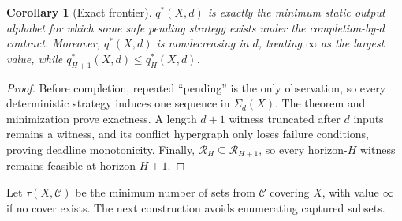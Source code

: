\documentclass[letterpaper,10pt,conference]{ieeeconf}
\newtheorem{corollary}{Corollary}
\newcommand{\cR}{\mathcal R}
\begin{document}
\begin{corollary}[Exact frontier]
$q^*(X,d)$ is exactly the minimum static output alphabet for which some safe pending strategy
exists under the completion-by-$d$ contract. Moreover, $q^*(X,d)$ is nondecreasing in $d$, treating
$\infty$ as the largest value, while $q_{H+1}^*(X,d)\le q_H^*(X,d)$.
\end{corollary}
\begin{proof}
Before completion, repeated ``pending'' is the only observation, so every deterministic strategy
induces one sequence in $\Sigma_d(X)$. The theorem and minimization prove exactness. A length
$d+1$ witness truncated after $d$ inputs remains a witness, and its conflict hypergraph only loses
failure conditions, proving deadline monotonicity. Finally, $\cR_H\subseteq\cR_{H+1}$, so every
horizon-$H$ witness remains feasible at horizon $H+1$.
\end{proof}

Let $\tau(X,\mathcal C)$ be the minimum number of sets from $\mathcal C$ covering $X$, with
value $\infty$ if no cover exists. The next construction avoids enumerating captured subsets.
\end{document}
